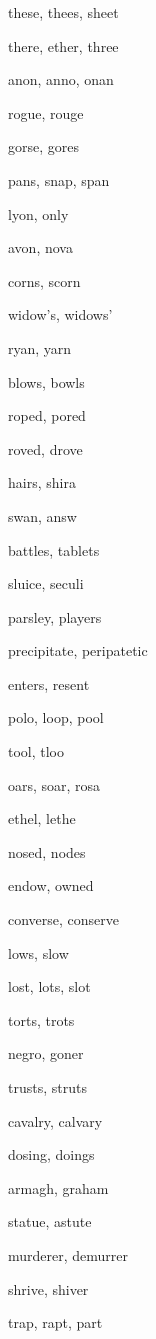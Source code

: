    \item these, thees, sheet
    \item there, ether, three
    \item anon, anno, onan
    \item rogue, rouge
    \item gorse, gores
    \item pans, snap, span
    \item lyon, only
    \item avon, nova
    \item corns, scorn
    \item widow's, widows'
    \item ryan, yarn
    \item blows, bowls
    \item roped, pored
    \item roved, drove
    \item hairs, shira
    \item swan, answ
    \item battles, tablets
    \item sluice, seculi
    \item parsley, players
    \item precipitate, peripatetic
    \item enters, resent
    \item polo, loop, pool
    \item tool, tloo
    \item oars, soar, rosa
    \item ethel, lethe
    \item nosed, nodes
    \item endow, owned
    \item converse, conserve
    \item lows, slow
    \item lost, lots, slot
    \item torts, trots
    \item negro, goner
    \item trusts, struts
    \item cavalry, calvary
    \item dosing, doings
    \item armagh, graham
    \item statue, astute
    \item murderer, demurrer
    \item shrive, shiver
    \item trap, rapt, part
